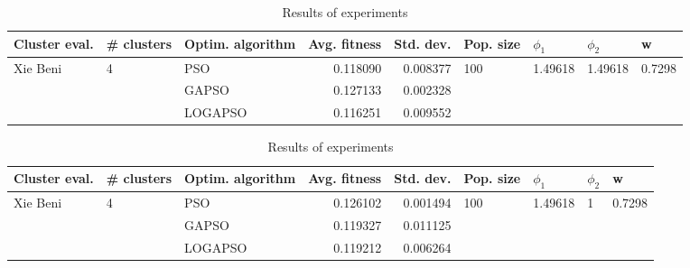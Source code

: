 \documentclass{article}
\begin{document}
\begin{table}
\centering
\caption{Results of experiments}
\begin{tabular}{lllrrllll}
\toprule
            Cluster eval. &        \# clusters & Optim. algorithm &  Avg. fitness &  Std. dev. &            Pop. size &               $\phi_{1}$ &               $\phi_{2}$ &                       w \\
\midrule
\multirow{3}{*}{Xie Beni} & \multirow{3}{*}{4} &              PSO &      0.118090 &   0.008377 & \multirow{3}{*}{100} & \multirow{3}{*}{1.49618} & \multirow{3}{*}{1.49618} & \multirow{3}{*}{0.7298} \\
                          &                    &            GAPSO &      0.127133 &   0.002328 &                      &                          &                          &                         \\
                          &                    &          LOGAPSO &      0.116251 &   0.009552 &                      &                          &                          &                         \\
\bottomrule
\end{tabular}
\end{table}
\begin{table}
\centering
\caption{Results of experiments}
\begin{tabular}{lllrrllll}
\toprule
            Cluster eval. &        \# clusters & Optim. algorithm &  Avg. fitness &  Std. dev. &            Pop. size &               $\phi_{1}$ &         $\phi_{2}$ &                       w \\
\midrule
\multirow{3}{*}{Xie Beni} & \multirow{3}{*}{4} &              PSO &      0.126102 &   0.001494 & \multirow{3}{*}{100} & \multirow{3}{*}{1.49618} & \multirow{3}{*}{1} & \multirow{3}{*}{0.7298} \\
                          &                    &            GAPSO &      0.119327 &   0.011125 &                      &                          &                    &                         \\
                          &                    &          LOGAPSO &      0.119212 &   0.006264 &                      &                          &                    &                         \\
\bottomrule
\end{tabular}
\end{table}
\end{document}
